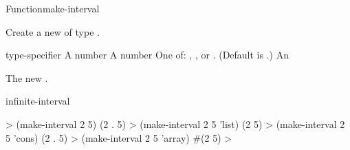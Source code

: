 \documentclass[10pt,twoside,english,pdftex]{article}
\begin{document}
\begin{functiondoc}{Function}{make-interval}%
  { 
    }
%
%

\fnsyntax

\fnpurpose Create a new  of type .

\fnpackage {}

\fnmodule {}

\fnargs
\begin{args}{type-specifier}
\arg[start] A number
\arg[end] A number
 One of: , , or .
  (Default is .)
 An 
\end{args}

\fnreturns The new .

\begin{alsos}{infinite-interval}
\end{alsos}

\fnexamples
%
\W\supp
\begin{example}
  > (make-interval 2 5)
  (2 . 5)
  > (make-interval 2 5 'list)
  (2 5)
  > (make-interval 2 5 'cons)
  (2 . 5)
  > (make-interval 2 5 'array)
  #(2 5)
  >
\end{example}

\end{functiondoc}

\end{document}
